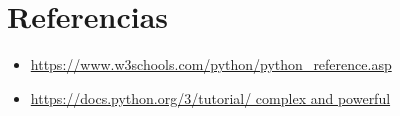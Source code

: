 \documentclass{article}
\begin{document}
	
\section{Referencias}
\begin{itemize}			
	\item \url{https://www.w3schools.com/python/python_reference.asp}
	\item\url{https://docs.python.org/3/tutorial/ complex and powerful}
\end{itemize}	
	
%
%
%
			
\end{document}
